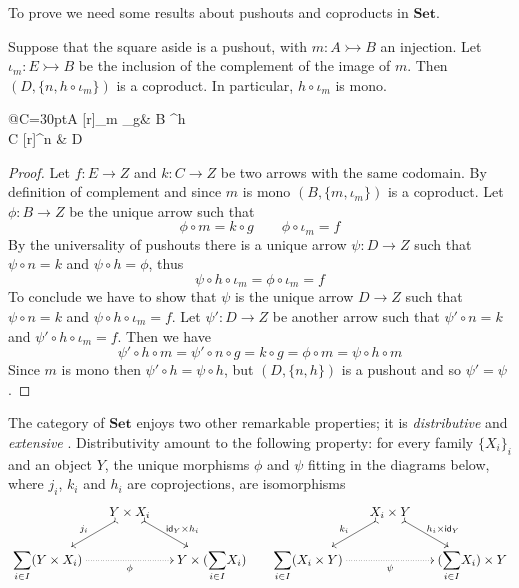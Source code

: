 \documentclass[3p]{elsarticle}
\newcommand{\Set}{\mathbf{Set}}
\newcommand{\Sum}{\mathlarger{\sum}}
\newcommand{\mto}{\rightarrowtail}
\newcommand{\id}[1]{\mathsf{id}_{#1}}
\theoremstyle{remark}
\theoremstyle{definition}
\begin{document}
To prove  we need some results about pushouts and coproducts in $\Set$.

\noindent
\begin{minipage}[l]{.85\linewidth}
\begin{lem}\label{lem:po_set}
Suppose that the square aside is a pushout, with $m\colon A\mto B$ an injection. Let $\iota_{m}\colon E\mto B$ be the inclusion of the complement of the image of $m$. Then $(D, \{n, h\circ \iota_m \})$ is a coproduct. In particular, $h\circ \iota_m$ is mono.
\end{lem}
\end{minipage}
\hfill 
\begin{minipage}[r]{.23\linewidth}
\xymatrix@R=15pt@C=30pt{A \ar@{>->}[r]_{m}  \ar[d]_{g}& B \ar[d]^{h}\\ C \ar@{>->}[r]^{n} & D}
\end{minipage}
\begin{proof}
		 Let $f\colon E\to Z$ and $k\colon C\to Z$ be two arrows with the same codomain. By definition of complement and since $m$ is mono $(B, \{m, \iota_m\})$ is a coproduct. Let $\phi\colon B\to Z$ be the unique arrow such that \[\phi\circ m=k\circ g \qquad \phi \circ \iota_m=f\] 
		By the universality of pushouts there is a unique arrow $\psi \colon D\to Z$ such that $\psi \circ n=k$ and $\psi \circ h=\phi$, thus 
		\[
		\psi \circ h\circ \iota_m =\phi \circ \iota_m=f\]	
To conclude we have to show that $\psi$ is the unique arrow $D\to Z$ such that $\psi \circ n =k$ and $\psi \circ h\circ \iota_m=f$. Let $\psi'\colon D\to Z$ be another arrow such that $\psi' \circ n=k$ and $\psi' \circ h\circ \iota_m=f$. Then we have
		\[\psi'\circ h\circ m=\psi'\circ n\circ g=k\circ g=\phi \circ m =\psi \circ h\circ m \]
	Since $m$ is mono then $\psi'\circ h=\psi \circ h$,  but $(D, \{n, h\})$ is a pushout and so $\psi'=\psi$. 
\end{proof}

The category of $\Set$ enjoys two other remarkable properties; it is \emph{distributive} and \emph{extensive} \cite{carboni1993introduction}\label{word:ext}. Distributivity amount to the following property: for every family $\{X_i\}_{i}$ and an object $Y$, the unique morphisms $\phi$ and $\psi $ fitting in the diagrams below, where $j_i$, $k_i$ and $h_i$ are coprojections, are isomorphisms
\[\xymatrix@C=15pt@R=15pt{&Y\times X_i \ar@{>->}[dl]_{j_i} \ar@{>->}[dr]^{\id{Y}\times h_i} &&& X_i \times Y \ar@{>->}[dl]_{k_i} \ar@{>->}[dr]^{ h_i \times \id{Y}} \\ \Sum_{i\in I} (Y\times X_i) \ar@{.>}[rr]_{\phi}&& Y\times (\Sum_{i\in I}X_i) & \Sum_{i\in I}  (X_i \times Y )\ar@{.>}[rr]_{\psi}&&  (\Sum_{i\in I}X_i) \times Y }\]
\end{document}
